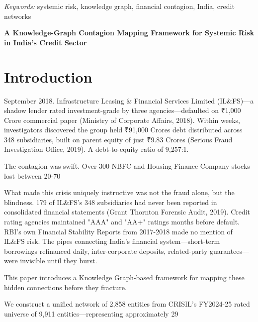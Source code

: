 \documentclass[12pt]{article}
\begin{document}
\noindent\textit{Keywords:} systemic risk, knowledge graph, financial contagion, India, credit networks

\newpage
\begin{center}
\textbf{A Knowledge-Graph Contagion Mapping Framework for Systemic Risk in India's Credit Sector}
\end{center}

\section*{Introduction}
September 2018. Infrastructure Leasing & Financial Services Limited (IL&FS)—a shadow lender rated investment-grade by three agencies—defaulted on ₹1,000 Crore commercial paper (Ministry of Corporate Affairs, 2018). Within weeks, investigators discovered the group held ₹91,000 Crores debt distributed across 348 subsidiaries, built on parent equity of just ₹9.83 Crores (Serious Fraud Investigation Office, 2019). A debt-to-equity ratio of 9,257:1.

The contagion was swift. Over 300 NBFC and Housing Finance Company stocks lost between 20-70%

What made this crisis uniquely instructive was not the fraud alone, but the blindness. 179 of IL&FS's 348 subsidiaries had never been reported in consolidated financial statements (Grant Thornton Forensic Audit, 2019). Credit rating agencies maintained "AAA" and "AA+" ratings months before default. RBI's own Financial Stability Reports from 2017-2018 made no mention of IL&FS risk. The pipes connecting India's financial system—short-term borrowings refinanced daily, inter-corporate deposits, related-party guarantees—were invisible until they burst.

This paper introduces a Knowledge Graph-based framework for mapping these hidden connections before they fracture.

We construct a unified network of 2,858 entities from CRISIL's FY2024-25 rated universe of 9,911 entities—representing approximately 29%
\end{document}
